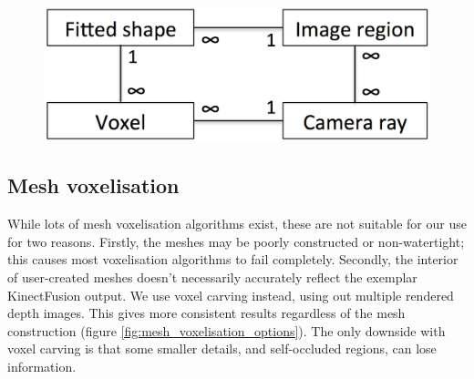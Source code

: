 \documentclass[10pt,a4paper, twocolumn]{article}
\begin{document}
\begin{figure}
	\centering%
	\includegraphics[width=1.0\linewidth]{relational}%
	\label{fig:relational}%
\end{figure}



\subsection{Mesh voxelisation}

While lots of mesh voxelisation algorithms exist, these are not suitable for our use for two reasons.
Firstly, the meshes may be poorly constructed or non-watertight; this causes most voxelisation algorithms to fail completely.
Secondly, the interior of user-created meshes doesn't necessarily accurately reflect the exemplar KinectFusion output.
We use voxel carving instead, using out multiple rendered depth images.
This gives more consistent results regardless of the mesh construction (figure \ref{fig:mesh_voxelisation_options}).
The only downside with voxel carving is that some smaller details, and self-occluded regions, can lose information.
\end{document}
